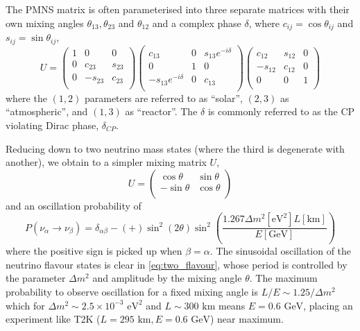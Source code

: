 The PMNS matrix is often parameterised into three separate matrices with their own mixing angles $\theta_{13},\theta_{23}$ and $\theta_{12}$ and a complex phase $\delta$, where $c_{ij}=\cos\theta_{ij}$ and $s_{ij}=\sin\theta_{ij}$\cite{boris_mixing},
\begin{equation}
U = 
\begin{pmatrix}
1 & 0 & 0 \\
0 & c_{23} & s_{23} \\
0 & -s_{23} & c_{23} \\
\end{pmatrix}
\begin{pmatrix}
c_{13} & 0 & s_{13}e^{-i\delta} \\
0 & 1 & 0 \\
-s_{13}e^{-i\delta} & 0 & c_{13} \\
\end{pmatrix}
\begin{pmatrix}
c_{12} & s_{12} & 0 \\
-s_{12} & c_{12} & 0 \\
0 & 0 & 1 \\
\end{pmatrix}
\end{equation}
where the $(1,2)$ parameters are referred to as ``solar'', $(2,3)$ as ``atmospheric'', and $(1,3)$ as ``reactor''. The $\delta$ is commonly referred to as the CP violating Dirac phase, $\delta_{CP}$. 

Reducing down to two neutrino mass states (where the third is degenerate with another), we obtain to a simpler mixing matrix $U$,
\begin{equation}
U = 
\begin{pmatrix}
\cos\theta & \sin\theta \\
- \sin\theta & \cos \theta \\
\end{pmatrix}
\end{equation}
and an oscillation probability of
\begin{equation}
P(\nu_\alpha \rightarrow \nu_\beta) = \delta_{\alpha \beta} -(+) \sin^2 \left( 2\theta \right) \sin^2 \left( \frac{1.267 \Delta m^2 \left[\text{eV}^2\right] L\left[\text{km}\right]}{E\left[\text{GeV}\right]} \right)
\label{eq:two_flavour}
\end{equation}
where the positive sign is picked up when $\beta = \alpha$. The sinusoidal oscillation of the neutrino flavour states is clear in \autoref{eq:two_flavour}, whose period is controlled by the parameter $\Delta m^2$ and amplitude by the mixing angle $\theta$. The maximum probability to observe oscillation for a fixed mixing angle is $L/E \sim 1.25/\Delta m^2$ which for $\Delta m^2 \sim 2.5\times10^{-3}\text{ eV}^2$ and $L\sim300\text{ km}$ means $E=0.6\text{ GeV}$, placing an experiment like T2K ($L=295\text{ km}, E = 0.6\text{ GeV}$) near maximum.

